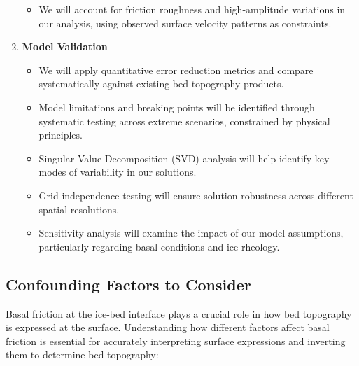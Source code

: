 \begin{enumerate}
\begin{itemize}
    \item We will account for friction roughness and high-amplitude variations in our analysis, using observed surface velocity patterns as constraints.
    \end{itemize}

\item\textbf{Model Validation}
    \begin{itemize}
    \item We will apply quantitative error reduction metrics and compare systematically against existing bed topography products.
    
    \item Model limitations and breaking points will be identified through systematic testing across extreme scenarios, constrained by physical principles.
    
    \item Singular Value Decomposition (SVD) analysis will help identify key modes of variability in our solutions.
    
    \item Grid independence testing will ensure solution robustness across different spatial resolutions.
    
    \item Sensitivity analysis will examine the impact of our model assumptions, particularly regarding basal conditions and ice rheology.
    \end{itemize}
\end{enumerate}


\subsection*{Confounding Factors to Consider}

Basal friction at the ice-bed interface plays a crucial role in how bed topography is expressed at the surface. Understanding how different factors affect basal friction is essential for accurately interpreting surface expressions and inverting them to determine bed topography:

